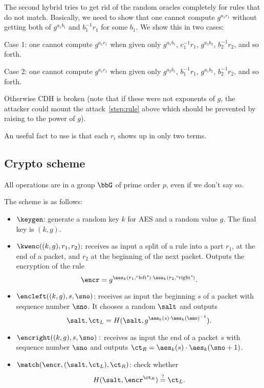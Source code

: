 The second hybrid tries to get rid of the random oracles completely for rules that do not match.
Basically, we need to show that one cannot compute $g^{a_1 r_1}$ without getting both of $g^{a_1 b_1}$ and $b_1^{-1} r_1$ for some $b_1$.
We show this in two cases:

Case 1:   one cannot compute $g^{a_1 r_1}$  when given only
$g^{a_1 b_1}$, $c_1^{-1} r_1$, $g^{a_1b_2}$, $b_2^{-1} r_2$, and so forth.

Case 2:   one cannot compute $g^{a_1 r_1}$  when given only
$g^{a_2 b_1}$, $b_1^{-1} r_1$, $g^{a_1b_2}$, $b_2^{-1} r_2$, and so forth.

Otherwise CDH is broken (note that if these were not exponents of $g$, the attacker could mount the attack~\ref{step:rule} above which should be prevented by raising to the power of $g$).

An useful fact to use is that each $r_i$ shows up in only two terms.

 \subsection{Crypto scheme}
 
 All operations are in a group $\bbG$ of prime order $p$, even if we don't say so.  
 
 The scheme is as follows:
 \begin{itemize}
 \item $\keygen$: generate a random key $k$ for AES and a random value $g$. The final key is $(k, g)$. 
 \item $\kwenc((k,g),  r_1, r_2)$: receives as input a split of a rule into a part $r_1$, at the end of a packet, and $r_2$ at the beginning of the next packet. Outputs the encryption of the rule \[ \encr = g^{\aes_k(r_1, \text{``left"}) \cdot \aes_k(r_2, \text{``right"})}.\] 
 \item $\encleft((k, g), s, \sno)$: receives as input the beginning $s$ of a packet with sequence number $\sno$. It chooses a random $\salt$ and outputs \[ \salt, \ct_L = H(\salt, g^{\aes_k(s) \cdot \aes_k(\sno)^{-1}}).\]
 \item $\encright((k, g), s, \sno):$ receives as input the end of a packet $s$ with sequence number $\sno$ and outputs $\ct_R = \aes_k(s) \cdot \aes_k(\sno+1)$. 
 \item $\match(\encr, (\salt, \ct_L), \ct_R)$: check whether \[H(\salt, \encr^{\ct_R}) \stackrel{?}{=} \ct_L.\]
 \end{itemize}
 

